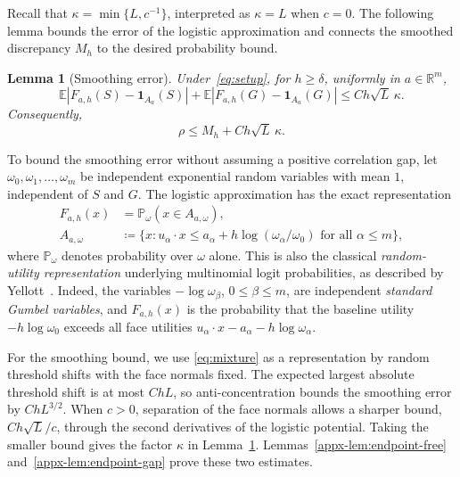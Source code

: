 \documentclass[11pt,letterpaper]{article}
\newtheorem{lemma}{Lemma}
\theoremstyle{remark}
\newcommand{\E}{\mathbb E}
\newcommand{\Pp}{\mathbb P}
\newcommand{\R}{\mathbb R}
\newcommand{\ind}{\mathbf 1}
\begin{document}
Recall that \(\kappa=\min\{L,c^{-1}\}\), interpreted as
\(\kappa=L\) when \(c=0\). The following lemma bounds the error
of the logistic approximation and connects the smoothed discrepancy
\(M_h\) to the desired probability bound.
\begin{lemma}[Smoothing error]\label{lem:endpoint}
Under~\eqref{eq:setup}, for \(h\ge\delta\), uniformly in
\(a\in\R^m\),
\begin{equation}
 \E|F_{a,h}(S)-\ind_{A_a}(S)|+
 \E|F_{a,h}(G)-\ind_{A_a}(G)|\le Ch\sqrt L\,\kappa.
 \label{eq:endpoint-error}
\end{equation}
Consequently,
\begin{equation}
 \rho\le M_h+Ch\sqrt L\,\kappa.
 \label{eq:endpoint-min}
\end{equation}
\end{lemma}

To bound the smoothing error without assuming a positive correlation
gap, let \(\omega_0,\omega_1,\ldots,\omega_m\) be independent
exponential random variables with mean \(1\), independent of \(S\) and
\(G\). The logistic approximation has the exact representation
\begin{equation}
 \begin{split}
 F_{a,h}(x)&=\Pp_\omega(x\in A_{a,\omega}),\\
 A_{a,\omega}&\coloneqq\{x:u_\alpha\cdot x\le
 a_\alpha+h\log(\omega_\alpha/\omega_0)
                   \text{ for all }\alpha\le m\},
 \end{split}
 \label{eq:mixture}
\end{equation}
where $\Pp_\omega$ denotes probability over $\omega$ alone. 
This is also the classical \emph{random-utility representation}
underlying multinomial logit probabilities, as described
by Yellott~\cite[Section~2.6]{Yellott1977}. Indeed, the variables
\(-\log\omega_\beta\), \(0\le\beta\le m\), are independent
\emph{standard Gumbel variables}, and \(F_{a,h}(x)\) is the probability
that the baseline utility \(-h\log\omega_0\) exceeds all face utilities
\(u_\alpha\cdot x-a_\alpha-h\log\omega_\alpha\).

For the smoothing bound, we use \eqref{eq:mixture} as a representation
by random threshold shifts with the face normals fixed.
The expected largest absolute threshold shift is at most
\(ChL\), so anti-concentration bounds the smoothing error by
\(ChL^{3/2}\). When \(c>0\), separation of the face normals
allows a sharper bound, \(Ch\sqrt L/c\), through the second
derivatives of the logistic potential. Taking the smaller bound
gives the factor \(\kappa\) in Lemma~\ref{lem:endpoint}.
Lemmas~\ref{appx-lem:endpoint-free} and~\ref{appx-lem:endpoint-gap}
prove these two estimates.
\end{document}
